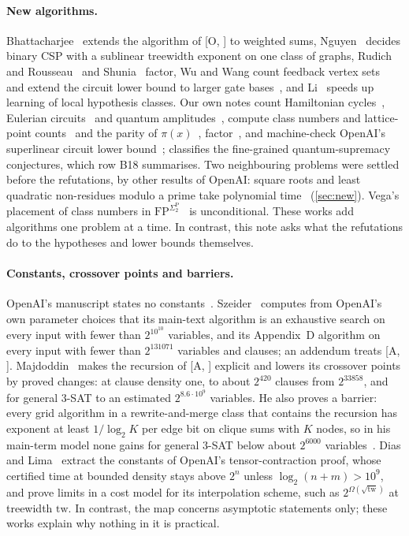 \documentclass[10pt]{amsart}
\theoremstyle{plain}
\theoremstyle{definition}
\theoremstyle{remark}
\numberwithin{equation}{section}
\newcommand{\A}[1][]{\textup{[A\if\relax\detokenize{#1}\relax\else, #1\fi]}}
\newcommand{\Oa}[1][]{\textup{[O\if\relax\detokenize{#1}\relax\else, #1\fi]}}
\begin{document}
\paragraph{New algorithms.} Bhattacharjee~\cite{Bhattacharjee26} extends the algorithm of \Oa{} to
weighted sums, Nguyen~\cite{Nguyen26} decides binary CSP with a sublinear treewidth exponent on one
class of graphs, Rudich and Rousseau~\cite{RR26} and Shunia~\cite{Shu26} factor, Wu and Wang count
feedback vertex sets~\cite{WW26f} and extend the circuit lower bound to larger gate
bases~\cite{WW26c}, and Li~\cite{Li26} speeds up learning of local hypothesis classes. Our own notes
count Hamiltonian cycles~\cite{Tulsyan26}, Eulerian circuits~\cite{TulsyanE26} and quantum
amplitudes~\cite{TulsyanQ26}, compute class numbers and lattice-point counts~\cite{TulsyanCN26} and
the parity of $\pi(x)$~\cite{TulsyanP26}, factor~\cite{TulsyanF26}, and machine-check OpenAI's
superlinear circuit lower bound~\cite{TulsyanC26}; \cite[\S6.2]{TulsyanQ26} classifies the
fine-grained quantum-supremacy conjectures, which row B18 summarises. Two neighbouring problems were
settled before the refutations, by other results of OpenAI: square roots and least quadratic
non-residues modulo a prime take polynomial time~\cite{OAI003,OAI142} (\cref{sec:new}). Vega's
placement of class numbers in $\mathrm{FP}^{\Sigma_2^{\mathrm P}}$~\cite{Vega26} is unconditional.
These works add algorithms one problem at a time. In contrast, this note asks what the refutations
do to the hypotheses and lower bounds themselves.

\paragraph{Constants, crossover points and barriers.} OpenAI's manuscript states no
constants~\cite{DL26}. Szeider~\cite{Sze26} computes from OpenAI's own parameter choices that its main-text algorithm is
an exhaustive search on every input with fewer than $2^{10^{10}}$ variables, and its Appendix~D
algorithm on every input with fewer than $2^{131071}$ variables and clauses; an addendum treats \A.
Majdoddin~\cite{Maj26} makes the recursion of \A{} explicit and lowers its crossover points by proved
changes: at clause density one, to about $2^{420}$ clauses from $2^{33858}$, and for general $3$-SAT
to an estimated $2^{8.6\cdot10^9}$ variables. He also proves a barrier: every grid algorithm in a
rewrite-and-merge class that contains the recursion has exponent at least $1/\log_2K$ per edge bit on
clique sums with $K$ nodes, so in his main-term model none gains for general $3$-SAT below about
$2^{6000}$ variables~\cite[Thm.~4.13, Cor.~4.15, Cor.~4.19]{Maj26}. Dias and Lima~\cite{DL26} extract
the constants of OpenAI's tensor-contraction proof, whose certified time at bounded density stays
above $2^n$ unless $\log_2(n+m)>10^9$, and prove limits in a cost model for its interpolation
scheme, such as $2^{\Omega(\sqrt{\mathrm{tw}})}$ at treewidth $\mathrm{tw}$. In contrast, the map
concerns asymptotic statements only; these works explain why nothing in it is practical.
\end{document}
